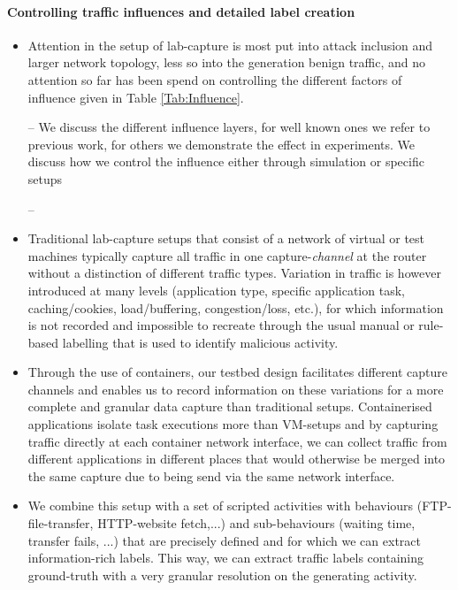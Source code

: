 \documentclass{article}
\begin{document}
\paragraph{Controlling traffic influences and detailed label creation}
\begin{itemize}


\item Attention in the setup of lab-capture is most put into attack inclusion and larger network topology, less so into the generation benign traffic, and no attention so far has been spend on controlling the different factors of influence given in Table \ref{Tab:Influence}.

\item[--] We discuss the different influence layers, for well known ones we refer to previous work, for others we demonstrate the effect in experiments. We discuss how we control the influence either through simulation or specific setups

\item[--]

\item Traditional lab-capture setups that consist of a network of virtual or test machines typically capture all traffic in one capture-\textit{channel} at the router without a distinction of different traffic types. Variation in traffic is however introduced at many levels (application type, specific application task, caching/cookies, load/buffering, congestion/loss, etc.), for which information is not  recorded and impossible to recreate through the usual manual or rule-based labelling that is used to identify malicious activity.

\item Through the use of containers, our testbed design facilitates different capture channels and enables us to record  information on these variations for a more complete and granular data capture than traditional setups. Containerised applications isolate task executions more than VM-setups and by capturing traffic directly at each container network interface, we can collect traffic from different applications in different places that would otherwise be merged into the same capture due to being send via the same network interface.

\item We combine this setup with a set of scripted activities with behaviours (FTP-file-transfer, HTTP-website fetch,...) and sub-behaviours (waiting time, transfer fails, ...) that are precisely defined and for which we can extract information-rich labels. This way, we can extract traffic labels containing ground-truth with a very granular resolution on the generating activity.


\end{itemize}
\end{document}
